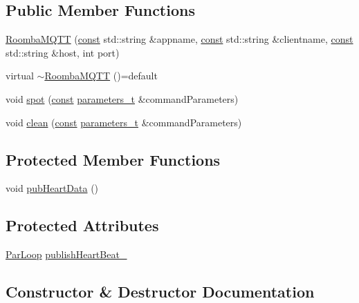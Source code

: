 \subsection*{Public Member Functions}
\begin{DoxyCompactItemize}
\item 
\hyperlink{class_roomba_m_q_t_t_a20d5a60deabb9b8148a3cf0f1409dc71}{Roomba\+M\+Q\+TT} (\hyperlink{functions__c_8js_afacfd9c985d225bb07483b887a801b6f}{const} std\+::string \&appname, \hyperlink{functions__c_8js_afacfd9c985d225bb07483b887a801b6f}{const} std\+::string \&clientname, \hyperlink{functions__c_8js_afacfd9c985d225bb07483b887a801b6f}{const} std\+::string \&host, int port)
\item 
virtual \hyperlink{class_roomba_m_q_t_t_a09e4ed694fcbf4e1f158d0f4eb49683d}{$\sim$\+Roomba\+M\+Q\+TT} ()=default
\item 
void \hyperlink{class_roomba_m_q_t_t_a6f3742feb79a0743c5a79402b9bc9c1f}{spot} (\hyperlink{functions__c_8js_afacfd9c985d225bb07483b887a801b6f}{const} \hyperlink{_json_m_q_t_t_8h_ad3b3bd6544a775cf1e31cd71610c5765}{parameters\+\_\+t} \&command\+Parameters)
\item 
void \hyperlink{class_roomba_m_q_t_t_ae1db76fddfb7c1394bfaed552de1b21d}{clean} (\hyperlink{functions__c_8js_afacfd9c985d225bb07483b887a801b6f}{const} \hyperlink{_json_m_q_t_t_8h_ad3b3bd6544a775cf1e31cd71610c5765}{parameters\+\_\+t} \&command\+Parameters)
\end{DoxyCompactItemize}
\subsection*{Protected Member Functions}
\begin{DoxyCompactItemize}
\item 
void \hyperlink{class_roomba_m_q_t_t_af039bf156519a272d7770831894d0ac8}{pub\+Heart\+Data} ()
\end{DoxyCompactItemize}
\subsection*{Protected Attributes}
\begin{DoxyCompactItemize}
\item 
\hyperlink{class_par_loop}{Par\+Loop} \hyperlink{class_roomba_m_q_t_t_a87013e349743a9ebd7f403adf5a23703}{publish\+Heart\+Beat\+\_\+}
\end{DoxyCompactItemize}


\subsection{Constructor \& Destructor Documentation}
